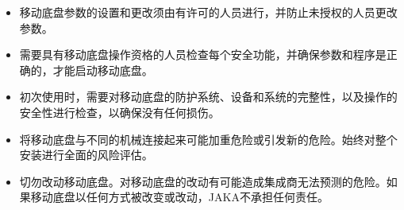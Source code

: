 \documentclass[a4paper,11pt,english,openany,oneside]{sphinxmanual}
\begin{document}
\begin{savenotes}
\begin{tabular}[t]{}
\begin{varwidth}[t]{}
\begin{itemize}
\item {} 
\sphinxAtStartPar
移动底盘参数的设置和更改须由有许可的人员进行，并防止未授权的人员更改参数。

\item {} 
\sphinxAtStartPar
需要具有移动底盘操作资格的人员检查每个安全功能，并确保参数和程序是正确的，才能启动移动底盘。

\item {} 
\sphinxAtStartPar
初次使用时，需要对移动底盘的防护系统、设备和系统的完整性，以及操作的安全性进行检查，以确保没有任何损伤。

\item {} 
\sphinxAtStartPar
将移动底盘与不同的机械连接起来可能加重危险或引发新的危险。始终对整个安装进行全面的风险评估。

\item {} 
\sphinxAtStartPar
切勿改动移动底盘。对移动底盘的改动有可能造成集成商无法预测的危险。如果移动底盘以任何方式被改变或改动，JAKA不承担任何责任。

\end{itemize}
\sphinxbeforeendvarwidth
\end{varwidth}%
\\
\sphinxbottomrule
\end{tabular}
\sphinxtableafterendhook\par
\sphinxattableend\end{savenotes}
\end{document}

